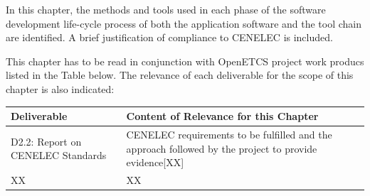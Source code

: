 \documentclass{template/openetcs_article}
\begin{document}




In this chapter, the methods and tools used in each phase of the software development life-cycle process of both the application software and the tool chain are identified. A brief justification of compliance to CENELEC is included.

This chapter has to be read in conjunction with OpenETCS project work producs listed in the Table below. The relevance of each deliverable for the scope of this chapter is also indicated:

\begin{flushleft}
\tablefirsthead{}
\tablehead{}
\tabletail{}
\tablelasttail{}
\begin{supertabular}[H]{|m{3cm}|m{11cm}|}
\hline
{}
Deliverable &
Content of Relevance for this Chapter\\\hline
D2.2: Report on CENELEC Standards &
CENELEC requirements to be fulfilled and the approach followed by the project to provide evidence[XX]\\\hline
XX &
XX \\\hline
\end{supertabular}
\end{flushleft}
\end{document}

